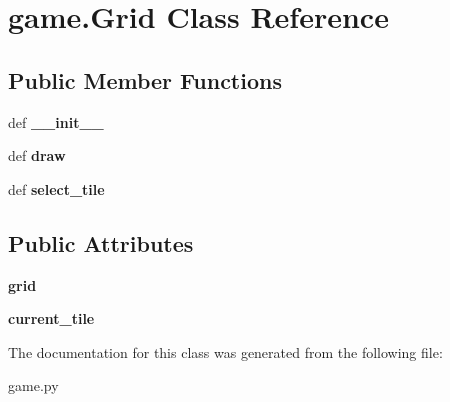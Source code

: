 \hypertarget{classgame_1_1Grid}{\section{game.\-Grid Class Reference}
\label{classgame_1_1Grid}
}
\subsection*{Public Member Functions}
\begin{DoxyCompactItemize}
\item 
\hypertarget{classgame_1_1Grid_acb70672526797a8800f5dfe90c2e31aa}{def {\bfseries \-\_\-\-\_\-init\-\_\-\-\_\-}}\label{classgame_1_1Grid_acb70672526797a8800f5dfe90c2e31aa}

\item 
\hypertarget{classgame_1_1Grid_a504aee27da6bc3d501b8df1feb4d9d5c}{def {\bfseries draw}}\label{classgame_1_1Grid_a504aee27da6bc3d501b8df1feb4d9d5c}

\item 
\hypertarget{classgame_1_1Grid_a27ebe0a3f3b8586ffeb8441778e52089}{def {\bfseries select\-\_\-tile}}\label{classgame_1_1Grid_a27ebe0a3f3b8586ffeb8441778e52089}

\end{DoxyCompactItemize}
\subsection*{Public Attributes}
\begin{DoxyCompactItemize}
\item 
\hypertarget{classgame_1_1Grid_a660850041b0d33a59e6674afc2e39d47}{{\bfseries grid}}\label{classgame_1_1Grid_a660850041b0d33a59e6674afc2e39d47}

\item 
\hypertarget{classgame_1_1Grid_a563c2421b9a4308e47953c1563b66b16}{{\bfseries current\-\_\-tile}}\label{classgame_1_1Grid_a563c2421b9a4308e47953c1563b66b16}

\end{DoxyCompactItemize}


The documentation for this class was generated from the following file\-:\begin{DoxyCompactItemize}
\item 
game.\-py\end{DoxyCompactItemize}
